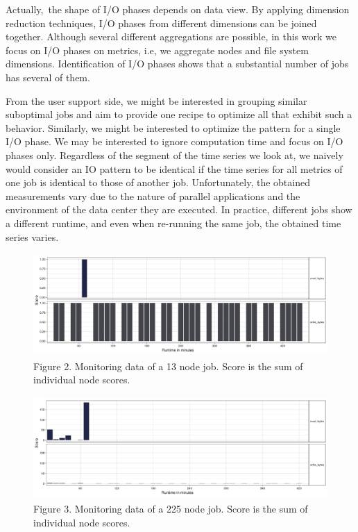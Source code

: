 \documentclass[]{llncs}
\begin{document}
Actually,\ the shape of I/O phases depends on data view.
By applying dimension reduction techniques, I/O phases from different dimensions can be joined together.
Although several different aggregations are possible, in this work we focus on  I/O phases on metrics, i.e, we aggregate nodes and file system dimensions.
Identification of I/O phases shows that a substantial number of jobs has several of them.

From the user support side, we might be interested in grouping similar suboptimal jobs and aim to provide one recipe to optimize all that exhibit such a behavior.
Similarly, we might be interested to optimize the pattern for a single I/O phase.
We may be interested to ignore computation time and focus on I/O phases only.
Regardless of the segment of the time series we look at, we naively would consider an IO pattern to be identical if the time series for all metrics of one job is identical to those of another job.
Unfortunately, the obtained measurements vary due to the nature of parallel applications and the environment of the data center they are executed.
In practice, different jobs show a different runtime, and even when re-running the same job, the obtained time series varies.

\begin{figure}
	\centering
	 \includegraphics[width=4.61in,height=1.54in]{./media/image27.png}
	 \caption{Figure 2. Monitoring data of a 13 node job. Score is the sum of individual node scores.}
	 \label{fig:typ_io:1}
\end{figure}

\begin{figure}
	\centering
	 \includegraphics[width=4.61in,height=1.54in]{./media/image28.png}
	 \caption{Figure 3. Monitoring data of a 225 node job. Score is the sum of individual node scores.}
	 \label{fig:typ_io:2}
\end{figure}
\end{document}
